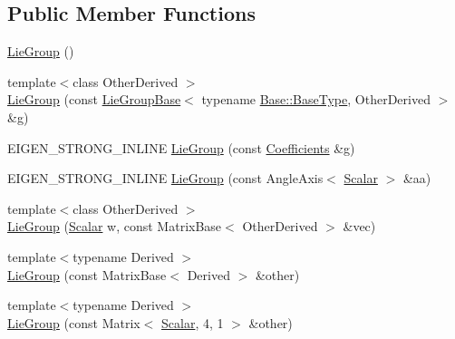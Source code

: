 \subsection*{Public Member Functions}
\begin{DoxyCompactItemize}
\item 
\hyperlink{class_lie_group_3_01_quaternion_3_01___scalar_01_4_01_4_a0810d682a2a637aa77877e84695bc884}{Lie\+Group} ()
\item 
{\footnotesize template$<$class Other\+Derived $>$ }\\\hyperlink{class_lie_group_3_01_quaternion_3_01___scalar_01_4_01_4_a56d1bf6da37ec19a2e2857f5c982410a}{Lie\+Group} (const \hyperlink{class_lie_group_base}{Lie\+Group\+Base}$<$ typename \hyperlink{class_lie_group_base_a895bed679f100c71c6dcbfd5532635b0}{Base\+::\+Base\+Type}, Other\+Derived $>$ \&g)
\item 
E\+I\+G\+E\+N\+\_\+\+S\+T\+R\+O\+N\+G\+\_\+\+I\+N\+L\+I\+NE \hyperlink{class_lie_group_3_01_quaternion_3_01___scalar_01_4_01_4_a7126b500c3e732fd1eba547c03fdf34e}{Lie\+Group} (const \hyperlink{class_lie_group_3_01_quaternion_3_01___scalar_01_4_01_4_a80504cfb3bcbf55c7d4c1e377ef9f782}{Coefficients} \&g)
\item 
E\+I\+G\+E\+N\+\_\+\+S\+T\+R\+O\+N\+G\+\_\+\+I\+N\+L\+I\+NE \hyperlink{class_lie_group_3_01_quaternion_3_01___scalar_01_4_01_4_ab91fa6322f5c3573fcff1b27a3c55d6f}{Lie\+Group} (const Angle\+Axis$<$ \hyperlink{class_lie_group_3_01_quaternion_3_01___scalar_01_4_01_4_a5c9cc4f61c2a1870f44da7951225dc4e}{Scalar} $>$ \&aa)
\item 
{\footnotesize template$<$class Other\+Derived $>$ }\\\hyperlink{class_lie_group_3_01_quaternion_3_01___scalar_01_4_01_4_a0b505b5a4a7bc08f699a347b0ead4a4f}{Lie\+Group} (\hyperlink{class_lie_group_3_01_quaternion_3_01___scalar_01_4_01_4_a5c9cc4f61c2a1870f44da7951225dc4e}{Scalar} w, const Matrix\+Base$<$ Other\+Derived $>$ \&vec)
\item 
{\footnotesize template$<$typename Derived $>$ }\\\hyperlink{class_lie_group_3_01_quaternion_3_01___scalar_01_4_01_4_a19ea5d83094ec2d26d6e856d670b952d}{Lie\+Group} (const Matrix\+Base$<$ Derived $>$ \&other)
\item 
{\footnotesize template$<$typename Derived $>$ }\\\hyperlink{class_lie_group_3_01_quaternion_3_01___scalar_01_4_01_4_ada8f3063710d6ef0737a43f0a6f55af2}{Lie\+Group} (const Matrix$<$ \hyperlink{class_lie_group_3_01_quaternion_3_01___scalar_01_4_01_4_a5c9cc4f61c2a1870f44da7951225dc4e}{Scalar}, 4, 1 $>$ \&other)

\end{DoxyCompactItemize}

